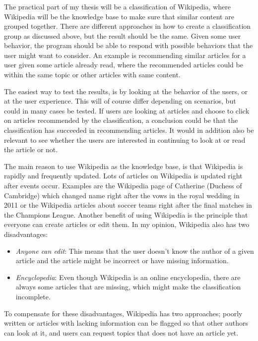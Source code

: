 \documentclass[11pt,english,a4paper]{article}
\begin{document}
\subsubsection*{}
The practical part of my thesis will be a classification of Wikipedia, where Wikipedia will be the knowledge base to make sure that similar content are grouped together. There are different approaches in how to create a classification group as discussed above, but the result should be the same. Given some user behavior, the program should be able to respond with possible behaviors that the user might want to consider. An example is recommending similar articles for a user given some article already read, where the recommended articles could be within the same topic or other articles with same content. 

The easiest way to test the results, is by looking at the behavior of the users, or at the user experience. This will of course differ depending on scenarios, but could in many cases be tested. If users are looking at articles and choose to click on articles recommended by the classification, a conclusion could be that the classification has succeeded in recommending articles. It would in addition also be relevant to see whether the users are interested in continuing to look at or read the article or not.  

The main reason to use Wikipedia as the knowledge base, is that Wikipedia is rapidly and frequently updated. Lots of articles on Wikipedia is updated right after events occur. Examples are the Wikipedia page of Catherine (Duchess of Cambridge) which changed name right after the vows in the royal wedding in 2011 or the Wikipedia articles about soccer teams right after the final matches in the Champions League. Another benefit of using Wikipedia is the principle that everyone can create articles or edit them. 
In my opinion, Wikipedia also has two disadvantages:
\begin{itemize}
\item \textit{Anyone can edit}: This means that the user doesn't know the author of a given article and the article might be incorrect or have missing information. 
\item \textit{Encyclopedia}: Even though Wikipedia is an online encyclopedia, there are always some articles that are missing, which might make the classification incomplete.  
\end{itemize}
To compensate for these disadvantages, Wikipedia has two approaches; poorly written or articles with lacking information can be flagged so that other authors can look at it, and users can request topics that does not have an article yet. 
\end{document}
